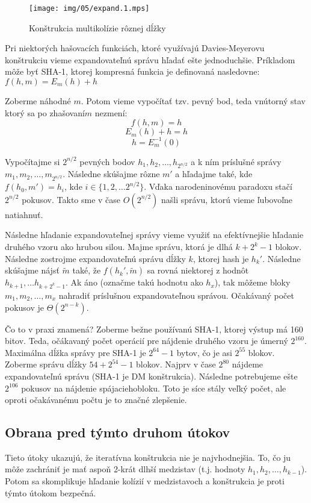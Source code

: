\begin{figure}[h!]
    \centering
    \texttt{[image: img/05/expand.1.mps]}
    \caption{Konštrukcia multikolízie rôznej dĺžky}
    \label{fig:expand1}
\end{figure}


Pri niektorých hašovacích funkciách, ktoré využívajú
Davies-Meyerovu konštrukciu vieme expandovateľnú správu hľadať
ešte jednoduchšie. Príkladom môže byť SHA-1, ktorej kompresná funkcia
je definovaná nasledovne:
$f(h, m) = E_m(h)+h$

Zoberme náhodné $m$. Potom vieme vypočítať tzv. pevný bod, teda vnútorný
stav ktorý sa po \clqq zhašovaní\crqq $m$ nezmení:
$$f(h,m) = h$$
$$E_m(h) + h= h$$
$$h = E_m^{-1}(0)$$

Vypočítajme si $2^{n/2}$ pevných bodov $h_1, h_2, \dots, h_{2^{n/2}}$ a k ním príslušné správy
$m_1, m_2, \dots, m_{2^{n/2}}$. 
Následne skúšajme rôzne $m'$ a hľadajme také, kde $f(h_0, m') = h_i$, kde $i \in \{1, 2, \dots 2^{n/2}\}$.
Vďaka narodeninovému paradoxu stačí $2^{n/2}$ pokusov. Takto sme v čase $O(2^{n/2})$ našli správu, ktorú
vieme ľubovoľne natiahnuť.

Následne hľadanie expandovateľnej správy vieme využiť na efektívnejšie hľadanie druhého vzoru ako hrubou silou.
Majme správu, ktorá je dlhá $k + 2^k - 1$ blokov. Následne zostrojme expandovateľnú správu dĺžky $k$, ktorej hash je $h_k'$.
Následne skúšajme nájsť  $\tilde{m}$ také, že $f(h_k', \tilde{m})$ sa rovná niektorej z hodnôt $h_{k+1}, \dots h_{k+2^k-1}$. Ak áno 
(označme takú hodnotu ako $h_x$), tak môžeme bloky $m_1, m_2, \dots, m_x$ nahradiť príslušnou expandovateľnou správou.
Očakávaný počet pokusov je $\Theta(2^{n-k})$. 

Čo to v praxi znamená? Zoberme bežne používanú SHA-1, ktorej výstup má 160 bitov. Teda,
očákavaný počet operácií pre nájdenie druhého vzoru je úmerný $2^{160}$. Maximálna dĺžka správy
pre SHA-1 je $2^{64} - 1$ bytov, čo je asi $2^{55}$ blokov. Zoberme správu dĺžky
$54 + 2^{54} - 1$ blokov. Najprv v čase $2^{80}$ nájdeme expandovateľnú správu (SHA-1 je DM konštrukcia).
Následne potrebujeme ešte $2^{106}$ pokusov na nájdenie \clqq spájacieho\crqq bloku.
Toto je síce stály veľký počet, ale oproti očakávanému počtu je to značné zlepšenie.

\subsection{Obrana pred týmto druhom útokov}
Tieto útoky ukazujú, že iteratívna konštrukcia nie je najvhodnejšia.
To, čo ju môže zachrániť je mať aspoň 2-krát dlhší medzistav 
(t.j. hodnoty $h_1, h_2, \dots, h_{k-1}$). Potom sa skomplikuje hľadanie
kolízií v medzistavoch a konštrukcia je proti týmto útokom bezpečná.

